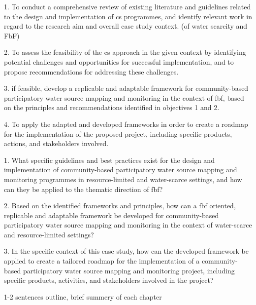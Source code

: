 1. To conduct a comprehensive review of existing literature and guidelines related to the design and implementation of \acrlong{cs} programmes, and identify relevant work in regard to the research aim and overall case study context. (of water scarcity and FbF)

2. To assess the feasibility of the \acrlong{cs} approach in the given context by identifying potential challenges and opportunities for successful implementation, and to propose recommendations for addressing these challenges.

3. if feasible, develop a replicable and adaptable framework for community-based participatory water source mapping and monitoring in the context of \acrlong{fbf}, based on the principles and recommendations identified in objectives 1 and 2.

4. To apply the adapted and developed frameworks in order to create a roadmap for the implementation of the proposed project, including specific products, actions, and stakeholders involved.

1. What specific guidelines and best practices exist for the design and implementation of community-based participatory water source mapping and monitoring programmes in resource-limited and water-scarce settings, and how can they be applied to the thematic direction of \acrlong{fbf}? %

2. Based on the identified frameworks and principles, how can a \acrlong{fbf} oriented, replicable and adaptable framework be developed for community-based participatory water source mapping and monitoring in the context of water-scarce and resource-limited settings? 

3. In the specific context of this case study, how can the developed framework be applied to create a tailored roadmap for the implementation of a community-based participatory water source mapping and monitoring project, including specific products, activities, and stakeholders involved in the project?








1-2 sentences outline, brief summery of each chapter

